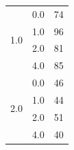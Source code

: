 \begin{longtable}{|c|c|c|c|c|}
\hline
\multirow{4}{*}{1.0} & \multicolumn{2}{c|}{0.0} & \multicolumn{2}{c|}{74} \\
& \multicolumn{2}{c|}{1.0} & \multicolumn{2}{c|}{96} \\
& \multicolumn{2}{c|}{2.0} & \multicolumn{2}{c|}{81} \\
& \multicolumn{2}{c|}{4.0} & \multicolumn{2}{c|}{85} \\
\hline
\multirow{4}{*}{2.0} & \multicolumn{2}{c|}{0.0} & \multicolumn{2}{c|}{46} \\
& \multicolumn{2}{c|}{1.0} & \multicolumn{2}{c|}{44} \\
& \multicolumn{2}{c|}{2.0} & \multicolumn{2}{c|}{51} \\
& \multicolumn{2}{c|}{4.0} & \multicolumn{2}{c|}{40} \\
\hline
\end{longtable}


